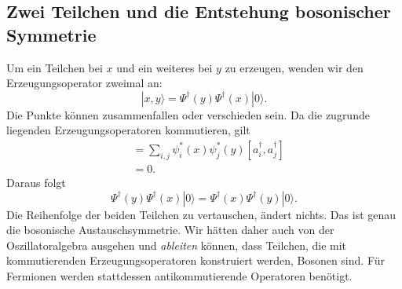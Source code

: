 \begin{classroomqa}
\end{classroomqa}

\subsection{Zwei Teilchen und die Entstehung bosonischer Symmetrie}

Um ein Teilchen bei \(x\) und ein weiteres bei \(y\) zu erzeugen, wenden wir den Erzeugungsoperator zweimal an:
\begin{equation}
|x,y\rangle
=\Psi^\dagger(y)\Psi^\dagger(x)|0\rangle.
\label{eq:l06-two-particle-state}
\end{equation}
Die Punkte können zusammenfallen oder verschieden sein. Da die zugrunde liegenden Erzeugungsoperatoren kommutieren, gilt
\begin{align}
[\Psi^\dagger(x),\Psi^\dagger(y)]
&=\sum_{i,j}\psi_i^*(x)\psi_j^*(y)
[a_i^\dagger,a_j^\dagger] \\
&=0.
\end{align}
Daraus folgt
\begin{equation}
\Psi^\dagger(y)\Psi^\dagger(x)|0\rangle
=\Psi^\dagger(x)\Psi^\dagger(y)|0\rangle.
\label{eq:l06-boson-exchange}
\end{equation}
Die Reihenfolge der beiden Teilchen zu vertauschen, ändert nichts. Das ist genau die bosonische Austauschsymmetrie. Wir hätten daher auch von der Oszillatoralgebra ausgehen und \emph{ableiten} können, dass Teilchen, die mit kommutierenden Erzeugungsoperatoren konstruiert werden, Bosonen sind. Für Fermionen werden stattdessen antikommutierende Operatoren benötigt.

\begin{classroomqa}
\end{classroomqa}

